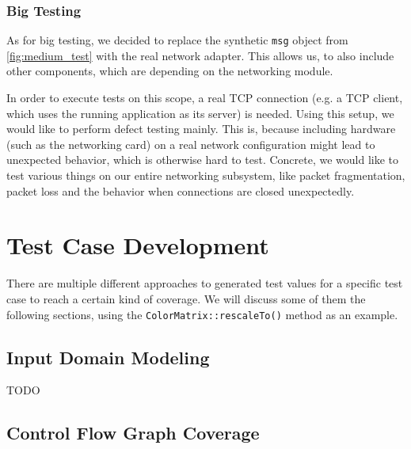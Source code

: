 \documentclass{scrreprt}
\begin{document}
\subsubsection{Big Testing}

As for big testing, we decided to replace the synthetic \texttt{msg} object from \vref{fig:medium_test} with the real network adapter. This allows us, to also include other components, which are depending on the networking module.

In order to execute tests on this scope, a real TCP connection (e.g. a TCP client, which uses the running application as its server) is needed. Using this setup, we would like to perform defect testing mainly. This is, because including hardware (such as the networking card) on a real network configuration might lead to unexpected behavior, which is otherwise hard to test. Concrete, we would like to test various things on our entire networking subsystem, like packet fragmentation, packet loss and the behavior when connections are closed unexpectedly.

\section{Test Case Development}

There are multiple different approaches to generated test values for a specific test case to reach a certain kind of coverage. We will discuss some of them the following sections, using the \texttt{ColorMatrix::rescaleTo()} method as an example.

\subsection{Input Domain Modeling}

TODO


\subsection{Control Flow Graph Coverage}
\end{document}
